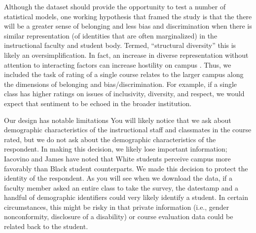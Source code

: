\documentclass[
  english,
]{book}
\begin{document}
Although the dataset should provide the opportunity to test a number of statistical models, one working hypothesis that framed the study is that the there will be a greater sense of belonging and less bias and discrimination when there is similar representation (of identities that are often marginalized) in the instructional faculty and student body. Termed, ``structural diversity'' \citep{lewis_black_2019} this is likely an oversimplification. In fact, an increase in diverse representation without attention to interacting factors can increase hostility on campus \citep{hurtado_linking_2007}. Thus, we included the task of rating of a single course relates to the larger campus along the dimensions of belonging and bias/discrimination. For example, if a single class has higher ratings on issues of inclusivity, diversity, and respect, we would expect that sentiment to be echoed in the broader institution.

Our design has notable limitations You will likely notice that we ask about demographic characteristics of the instructional staff and classmates in the course rated, but we do not ask about the demographic characteristics of the respondent. In making this decision, we likely lose important information; Iacovino and James \citeyearpar{iacovino_retaining_2016} have noted that White students perceive campus more favorably than Black student counterparts. We made this decision to protect the identity of the respondent. As you will see when we download the data, if a faculty member asked an entire class to take the survey, the datestamp and a handful of demographic identifiers could very likely identify a student. In certain circumstances, this might be risky in that private information (i.e., gender nonconformity, disclosure of a disability) or course evaluation data could be related back to the student.
\end{document}
